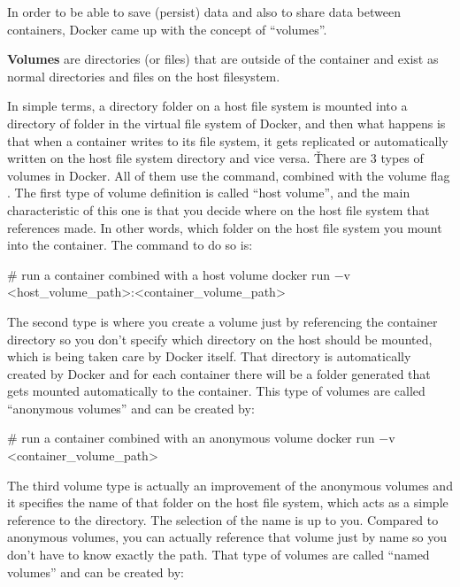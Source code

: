 In order to be able to save (persist) data and also to share data between containers, Docker came up with the concept
of ``volumes''.

\bd[Volumes]
\textbf{Volumes} are directories (or files) that are outside of the container and exist as normal directories and files
on the host filesystem.
\ed

In simple terms, a directory folder on a host file system is mounted into a directory of folder in the virtual file
system of Docker, and then what happens is that when a container writes to its file system, it gets replicated or
automatically written on the host file system directory and vice versa. \v

There are 3 types of volumes in Docker. All of them use the  command, combined with the volume flag
. The first type of volume definition is called ``host volume'', and the main characteristic of this one
is that you decide where on the host file system that references made. In other words, which folder on the host file
system you mount into the container. The command to do so is:

\begin{bash}
# run a container combined with a host volume
docker run $-$v <host_volume_path>:<container_volume_path>
\end{bash}

The second type is where you create a volume just by referencing the container directory so you don't specify which
directory on the host should be mounted, which is being taken care by Docker itself. That directory is automatically
created by Docker and for each container there will be a folder generated that gets mounted automatically to the
container. This type of volumes are called ``anonymous volumes'' and can be created by:

\begin{bash}
# run a container combined with an anonymous volume
docker run $-$v <container_volume_path>
\end{bash}

The third volume type is actually an improvement of the anonymous volumes and it specifies the name of that folder on
the host file system, which acts as a simple reference to the directory. The selection of the name is up to you.
Compared to anonymous volumes, you can actually reference that volume just by name so you don't have to know exactly
the path. That type of volumes are called ``named volumes'' and can be created by:

